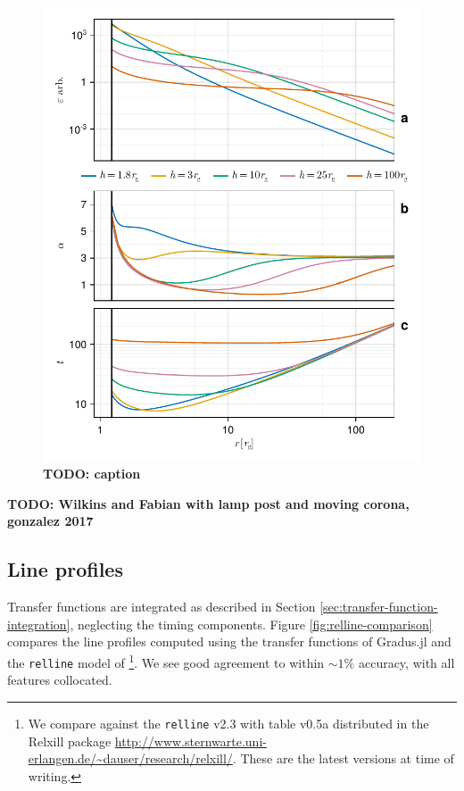 \documentclass[fleqn,usenatbib]{mnras}
\newcommand{\todo}[1]{{\noindent \bf \color{red} TODO: #1}}
\newcommand{\Gradus}{Gradus.jl }
\newcommand{\relline}{\texttt{relline} }
\begin{document}
\begin{figure}
	\centering
	\includegraphics[width=0.99\linewidth]{figures/emissivity.point-source.pdf}
	\caption{\todo{caption}}
	\label{fig:emissivity-profiles}
\end{figure}

\todo{Wilkins and Fabian with lamp post and moving corona, gonzalez 2017}

\subsection{Line profiles}

Transfer functions are integrated as described in Section \ref{sec:transfer-function-integration}, neglecting the timing components. Figure \ref{fig:relline-comparison} compares the line profiles computed using the transfer functions of \Gradus and the \relline model of \cite{dauser_broad_2010}\footnote{We compare against the \relline v2.3 with table v0.5a distributed in the Relxill package \url{http://www.sternwarte.uni-erlangen.de/~dauser/research/relxill/}. These are the latest versions at time of writing.}. We see good agreement to within $\sim 1\%$ accuracy, with all features collocated.
\end{document}

